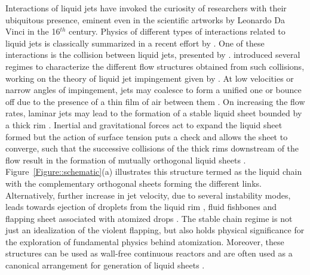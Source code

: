 \documentclass{jfm}
\begin{document}
Interactions of liquid jets have invoked the curiosity of researchers with their ubiquitous presence, eminent even in the scientific artworks by Leonardo Da Vinci in the 16$^{th}$ century. Physics of different types of interactions related to liquid jets is classically summarized in a recent effort by \cite{eggers2008physics}. One of these interactions is the collision between liquid jets, presented by \cite{rayleigh1879capillary}. \cite{bush2004collision} introduced several regimes to characterize the different flow structures obtained from such collisions, working on the theory of liquid jet impingement given by \cite{taylor1960formation}. At low velocities or narrow angles of impingement, jets may coalesce to form a unified one or bounce off due to the presence of a thin film of air between them \citep{wadhwa2013noncoalescence}. On increasing the flow rates, laminar jets may lead to the formation of a stable liquid sheet bounded by a thick rim \citep{yang2014liquid}. Inertial and gravitational forces act to expand the liquid sheet formed but the action of surface tension puts a check and allows the sheet to converge, such that the successive collisions of the thick rims downstream of the flow result in the formation of mutually orthogonal liquid sheets \citep{bush2004collision}. Figure~\ref{Figure::schematic}(a) illustrates this structure termed as the liquid chain with the complementary orthogonal sheets forming the different links. Alternatively, further increase in jet velocity, due to several instability modes, leads towards ejection of droplets from the liquid rim \citep{bremond2006atomization}, fluid fishbones \citep{bush2004collision} and flapping sheet \citep{villermaux2002life} associated with atomized drops \citep{ibrahim1991impinging}. The stable chain regime is not just an idealization of the violent flapping, but also holds physical significance for the exploration of fundamental physics behind atomization. Moreover, these structures can be used as wall-free continuous reactors \citep{erni2013free} and are often used as a canonical arrangement for generation of liquid sheets \citep{bush2004collision,taylor1960formation}.\\
\end{document}
